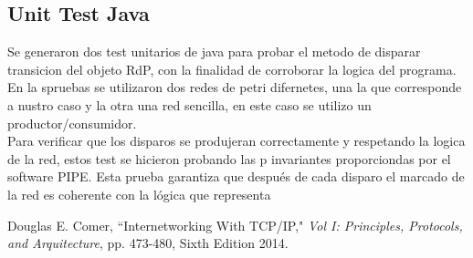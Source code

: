 \documentclass[10pt, a4paper,notitlepage]{article}
\begin{document}
\subsection{Unit Test Java}
Se generaron dos test unitarios de java para probar el metodo de disparar transicion del objeto RdP, con la finalidad de corroborar la logica del programa. En la spruebas se utilizaron dos redes de petri difernetes, una la que corresponde a nustro caso y la otra una red sencilla, en este caso se utilizo un productor/consumidor.\\
Para verificar que los disparos se produjeran correctamente y respetando la logica de la red, estos test se hicieron probando las p invariantes proporciondas por el software PIPE. Esta prueba garantiza que después de cada disparo el marcado de la red es coherente con la lógica que representa

\begin{thebibliography}{100} %
 Douglas E. Comer, ``Internetworking With TCP/IP," \emph{Vol I: Principles, Protocols, and Arquitecture}, pp. 473-480, Sixth Edition 2014.
\end{thebibliography}
\end{document}
